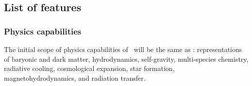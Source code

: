 \documentclass[11pt]{article}
\begin{document}
\subsection{List of features}



%
%
    \subsubsection{Physics capabilities}

    The initial scope of physics capabilities of \cello\ will be the
    same as \enzo: representations of baryonic and dark matter,
    hydrodynamics, self-gravity, multi-species chemistry, radiative
    cooling, cosmological expansion, star formation,
    magnetohydrodynamics, and radiation transfer.
\end{document}

